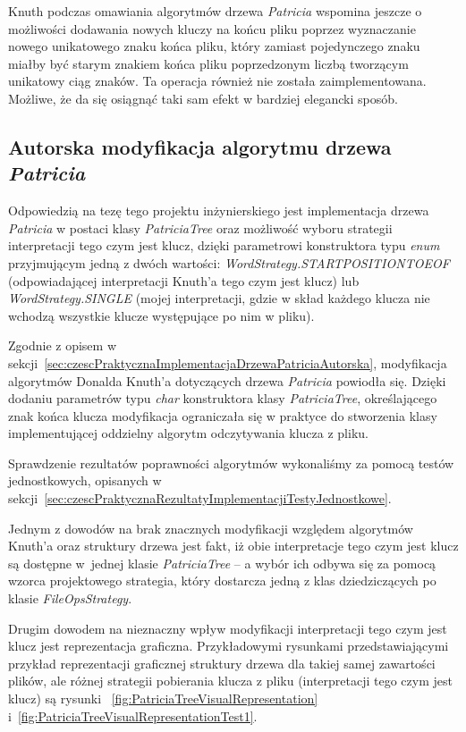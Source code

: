 		Knuth podczas omawiania algorytmów drzewa \emph{Patricia} wspomina jeszcze o możliwości dodawania nowych kluczy na końcu pliku poprzez wyznaczanie nowego unikatowego znaku końca pliku, który zamiast pojedynczego znaku miałby być starym znakiem końca pliku poprzedzonym liczbą tworzącym unikatowy ciąg znaków. Ta operacja również nie została zaimplementowana. Możliwe, że da się osiągnąć taki sam efekt w bardziej elegancki sposób. 
		
		\subsection{Autorska modyfikacja algorytmu drzewa \emph{Patricia}}\label{sec:RezultatyImplementacjiDrzewaPatriciaAutorska} 
	    
	    Odpowiedzią na tezę tego projektu inżynierskiego jest implementacja drzewa \emph{Patricia} w postaci klasy \emph{PatriciaTree} oraz możliwość wyboru strategii interpretacji tego czym jest klucz, dzięki parametrowi konstruktora typu \emph{enum} przyjmującym jedną z dwóch wartości: \emph{WordStrategy.START\textunderscore POSITION\textunderscore TO\textunderscore EOF} (odpowiadającej interpretacji Knuth'a tego czym jest klucz) lub \emph{WordStrategy.SINGLE} (mojej interpretacji, gdzie w skład każdego klucza nie wchodzą wszystkie klucze występujące po nim w pliku). 
	    
	    Zgodnie z opisem w sekcji~\ref{sec:czescPraktycznaImplementacjaDrzewaPatriciaAutorska}, modyfikacja algorytmów Donalda Knuth'a dotyczących drzewa \emph{Patricia} powiodła się. Dzięki dodaniu parametrów typu \emph{char} konstruktora klasy \emph{PatriciaTree}, określającego znak końca klucza modyfikacja ograniczała się w praktyce do stworzenia klasy implementującej oddzielny algorytm odczytywania klucza z pliku.
	    
	    Sprawdzenie rezultatów poprawności algorytmów wykonaliśmy za pomocą testów jednostkowych, opisanych w sekcji~\ref{sec:czescPraktycznaRezultatyImplementacjiTestyJednostkowe}. 
	    
	    Jednym z dowodów na brak znacznych modyfikacji względem algorytmów Knuth'a oraz struktury drzewa jest fakt, iż obie interpretacje tego czym jest klucz są dostępne w~jednej klasie \emph{PatriciaTree} -- a wybór ich odbywa się za pomocą wzorca projektowego strategia, który dostarcza jedną z klas dziedziczących po klasie \emph{FileOpsStrategy}. 
	    
	    Drugim dowodem na nieznaczny wpływ modyfikacji interpretacji tego czym jest klucz jest reprezentacja graficzna. Przykładowymi rysunkami przedstawiającymi przykład reprezentacji graficznej struktury drzewa dla takiej samej zawartości plików, ale różnej strategii pobierania klucza z pliku (interpretacji tego czym jest klucz) są rysunki ~\ref{fig:PatriciaTreeVisualRepresentation} i~\ref{fig:PatriciaTreeVisualRepresentationTest1}. 
	    
